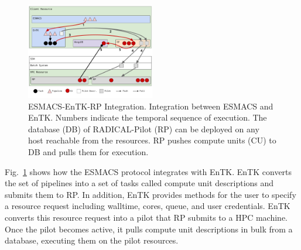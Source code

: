 \begin{figure}
\centering
  \includegraphics[width=0.5\textwidth]{ht-bac-rp_integration.pdf}
  \caption{ESMACS-EnTK-RP Integration.
  Integration between ESMACS and EnTK\@. Numbers indicate
  the temporal sequence of execution. The database (DB) of RADICAL-Pilot (RP)
  can be deployed on any host reachable from the resources. RP pushes compute
  units (CU) to DB and pulls them for execution.}
  \label{figure:ht-bac_rp}
\end{figure}


Fig.~\ref{figure:ht-bac_rp} shows how the ESMACS protocol integrates with
EnTK\@. EnTK converts the set of pipelines into a set of tasks called compute
unit descriptions and submits them to RP\@. In addition, EnTK provides
methods for the user to specify a resource request including walltime, cores,
queue, and user credentials. EnTK converts this resource request into a pilot
that RP submits to a HPC machine. Once the pilot becomes active, it pulls
compute unit descriptions in bulk from a database, executing them on the
pilot resources.